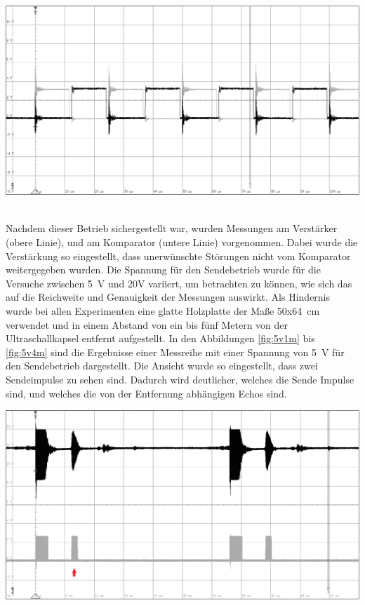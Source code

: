 \begin{minipage}{0.75\textwidth}
\includegraphics[width=1\textwidth%
]{Abbildungen/MessungenP2/Zwei_PWMs_von_der_CPU.PNG}
\label{fig:PWMs}
\end{minipage}\\
Nachdem dieser Betrieb sichergestellt war, wurden Messungen am Verstärker (obere Linie), und am Komparator (untere Linie) vorgenommen. Dabei wurde die Verstärkung so eingestellt, dass unerwünschte Störungen nicht vom Komparator weitergegeben wurden. Die Spannung für den Sendebetrieb wurde für die Versuche zwischen 5~V und 20V variiert, um betrachten zu können, wie sich das auf die Reichweite und Genauigkeit der Messungen auswirkt. Als Hindernis wurde bei allen Experimenten eine glatte Holzplatte der Maße 50x64~cm verwendet und in einem Abstand von ein bis fünf Metern von der Ultraschallkapsel entfernt aufgestellt. In den Abbildungen \ref{fig:5v1m} bis \ref{fig:5v4m} sind die Ergebnisse einer Messreihe mit einer Spannung von 5~V für den Sendebetrieb dargestellt. Die Ansicht wurde so eingestellt, dass zwei Sendeimpulse zu sehen sind. Dadurch wird deutlicher, welches die Sende Impulse sind, und welches die von der Entfernung abhängigen Echos sind.\\
\begin{minipage}{0.5\textwidth}
\includegraphics[width=1\textwidth%
]{Abbildungen/MessungenP2/5V/1mb.PNG}
\label{fig:5v1m}
\end{minipage}
